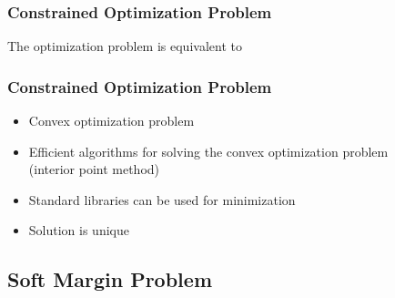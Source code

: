 \begin{frame}
  \frametitle{Constrained Optimization Problem \cont}

  The optimization problem is equivalent to \\[.75cm]

  \begin{center}
  \end{center}
\end{frame}


\begin{frame}
  \frametitle{Constrained Optimization Problem \cont}

  
  \begin{itemize}
    \item Convex optimization problem \\[.3cm]
    \item Efficient algorithms for solving the convex optimization problem \\
      (interior point method) \\[.3cm]
    \item Standard libraries can be used for minimization \\[.3cm]
    \item Solution is unique
  \end{itemize}
\end{frame}


\subsection{Soft Margin Problem}

